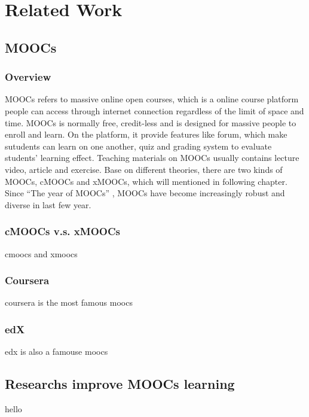 \chapter{Related Work}

\section{MOOCs}

\subsection{Overview}
MOOCs refers to massive online open courses, which is a online course platform people can access through internet connection regardless of the limit of space and time.
MOOCs is normally free, credit-less and is designed for massive people to enroll and learn.
On the platform, it provide features like forum, which make sutudents can learn on one another, quiz and grading system to evaluate students' learning effect.
Teaching materials on MOOCs usually contains lecture video, article and exercise.
Base on different theories, there are two kinds of MOOCs, cMOOCs and xMOOCs, which will mentioned in following chapter.
Since ``The year of MOOCs'' \cite{pappano2012}, MOOCs have become increasingly robust and diverse in last few year.

\subsection{cMOOCs v.s. xMOOCs}
cmoocs and xmoocs
\subsection{Coursera}
coursera is the most famous moocs
\subsection{edX}
edx is also a famouse moocs

\section{Researchs improve MOOCs learning}
hello
